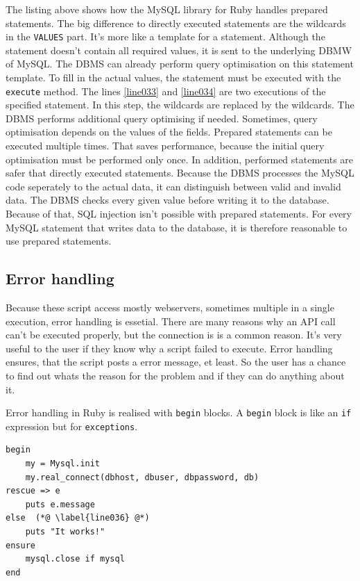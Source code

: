 The listing above shows how the MySQL library for Ruby handles prepared statements. The big difference to directly executed statements are the wildcards in the \lstinline{VALUES} part. It's more like a template for a statement. Although the statement doesn't contain all required values, it is sent to the underlying DBMW of MySQL. The DBMS can already perform query optimisation on this statement template. To fill in the actual values, the statement must be executed with the \lstinline{execute} method. The lines \ref{line033} and \ref{line034} are two executions of the specified statement. In this step, the wildcards are replaced by the wildcards. The DBMS performs additional query optimising if needed. Sometimes, query optimisation depends on the values of the fields. Prepared statements can be executed multiple times. That saves performance, because the initial query optimisation must be performed only once. In addition, performed statements are safer that directly executed statements. Because the DBMS processes the MySQL code seperately to the actual data, it can distinguish between valid and invalid data. The DBMS checks every given value before writing it to the database. Because of that, SQL injection isn't possible with prepared statements. For every MySQL statement that writes data to the database, it is therefore reasonable to use prepared statements. \cite{mysql:rubydoc}

\subsection{Error handling}
Because these script access mostly webservers, sometimes multiple in a single execution, error handling is essetial. There are many reasons why an API call can't be executed properly, but the connection is is a common reason. It's very useful to the user if  they know why a script failed to execute. Error handling ensures, that the script posts a error message, et least. So the user has a chance to find out whats the reason for the problem and if they can do anything about it. 

Error handling in Ruby is realised with \lstinline{begin} blocks. A \lstinline{begin} block is like an \lstinline{if} expression but for \lstinline{exceptions}. 

\begin{lstlisting}[aboveskip=1\baselineskip, caption=Error handling with \lstinline{begin} blocks., label=listing042]
begin
	my = Mysql.init
	my.real_connect(dbhost, dbuser, dbpassword, db)
rescue => e
	puts e.message
else  (*@ \label{line036} @*)
	puts "It works!"
ensure
	mysql.close if mysql
end
\end{lstlisting}

